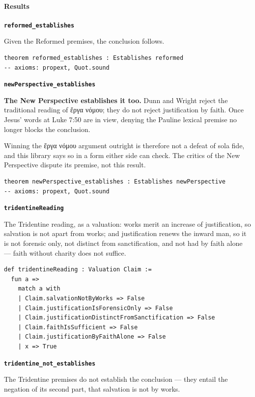 \documentclass[11pt]{article}
\begin{document}
\paragraph*{Results}
\leavevmode\par
\par\medskip\noindent\textbf{\texttt{reformed\_\allowbreak{}establishes}}\par\nobreak\noindent
Given the Reformed premises, the conclusion follows.

{\small\begin{verbatim}
theorem reformed_establishes : Establishes reformed
-- axioms: propext, Quot.sound
\end{verbatim}}
\par\medskip\noindent\textbf{\texttt{new\allowbreak{}Perspective\_\allowbreak{}establishes}}\par\nobreak\noindent
\textbf{The New Perspective establishes it too.} Dunn and Wright reject the traditional reading of ἔργα νόμου; they do not reject justification by faith. Once Jesus' words at Luke 7:50 are in view, denying the Pauline lexical premise no longer blocks the conclusion.

Winning the ἔργα νόμου argument outright is therefore not a defeat of sola fide, and this library says so in a form either side can check. The critics of the New Perspective dispute its premise, not this result.

{\small\begin{verbatim}
theorem newPerspective_establishes : Establishes newPerspective
-- axioms: propext, Quot.sound
\end{verbatim}}
\par\medskip\noindent\textbf{\texttt{tridentine\allowbreak{}Reading}}\par\nobreak\noindent
The Tridentine reading, as a valuation: works merit an increase of justification, so salvation is not apart from works; and justification renews the inward man, so it is not forensic only, not distinct from sanctification, and not had by faith alone — faith without charity does not suffice.

{\small\begin{verbatim}
def tridentineReading : Valuation Claim :=
  fun a =>
    match a with
    | Claim.salvationNotByWorks => False
    | Claim.justificationIsForensicOnly => False
    | Claim.justificationDistinctFromSanctification => False
    | Claim.faithIsSufficient => False
    | Claim.justificationByFaithAlone => False
    | x => True
\end{verbatim}}
\par\medskip\noindent\textbf{\texttt{tridentine\_\allowbreak{}not\_\allowbreak{}establishes}}\par\nobreak\noindent
The Tridentine premises do not establish the conclusion — they entail the negation of its second part, that salvation is not by works.
\end{document}
